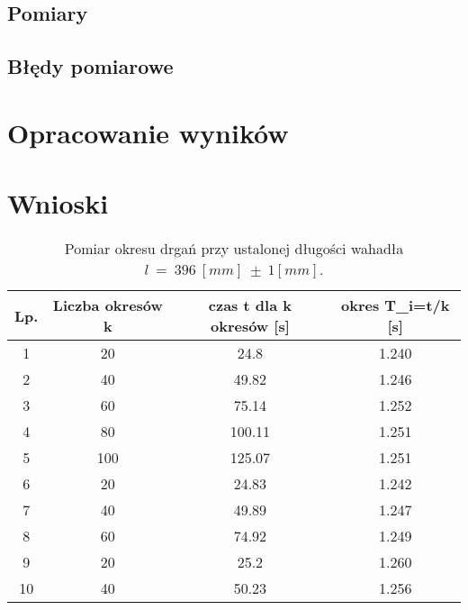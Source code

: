 \documentclass[a4paper,12pts]{article}
\begin{document}
	\subsection{Pomiary}
		
	\subsection{Błędy pomiarowe}
	
	\section{Opracowanie wyników}
	
	\section{Wnioski}
	

		
	\begin{table}[hb!]
		\centering
		\begin{tabular}{ | c | c | c | c | }
			\hline
			\textrm{Lp.} & \textrm{Liczba okresów } k & \textrm{czas } t \textrm{ dla } k \textrm{ okresów } [s] & \textrm{okres } T_i=t/k [s] \\ \hline
			1 & 20 & 24.8 & 1.240 \\ \hline
			2 & 40 & 49.82 & 1.246 \\ \hline
			3 & 60 & 75.14 & 1.252 \\ \hline
			4 & 80 & 100.11 & 1.251 \\ \hline
			5 & 100 & 125.07 & 1.251 \\ \hline
			6 & 20 & 24.83 & 1.242 \\ \hline
			7 & 40 & 49.89 & 1.247 \\ \hline
			8 & 60 & 74.92 & 1.249 \\ \hline
			9 & 20 & 25.2 & 1.260 \\ \hline
			10 & 40 & 50.23 & 1.256 \\ \hline
		\end{tabular}
		\caption{Pomiar okresu drgań przy ustalonej długości wahadła $l~=~396~[mm]~\pm~1 [mm]$.}
		\label{Tabela1}	
	\end{table}
	
\end{document}
